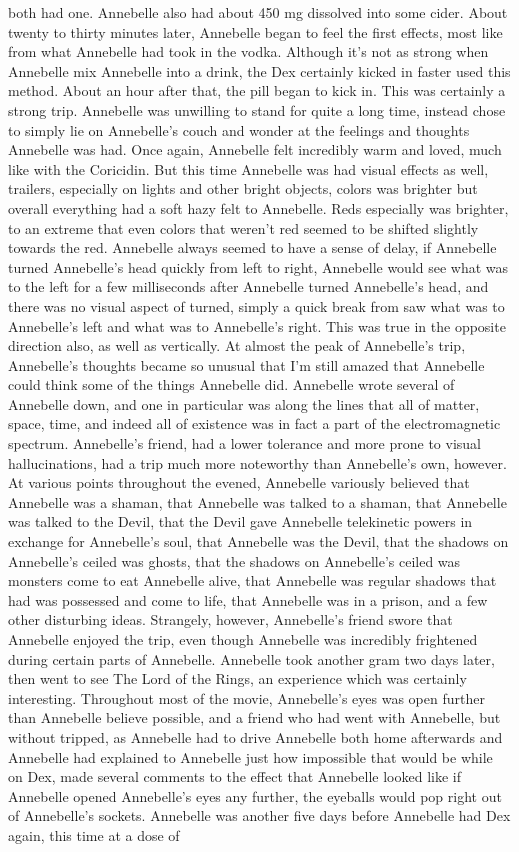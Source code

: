 \documentclass[12pt]{book}
\begin{document}
both had one. Annebelle also had about 450 mg dissolved into some cider. About twenty to thirty minutes later, Annebelle began to feel the first effects, most like from what Annebelle had took in the vodka. Although it's not as strong when Annebelle mix Annebelle into a drink, the Dex certainly kicked in faster used this method. About an hour after that, the pill began to kick in. This was certainly a strong trip. Annebelle was unwilling to stand for quite a long time, instead chose to simply lie on Annebelle's couch and wonder at the feelings and thoughts Annebelle was had. Once again, Annebelle felt incredibly warm and loved, much like with the Coricidin. But this time Annebelle was had visual effects as well, trailers, especially on lights and other bright objects, colors was brighter but overall everything had a soft hazy felt to Annebelle. Reds especially was brighter, to an extreme that even colors that weren't red seemed to be shifted slightly towards the red. Annebelle always seemed to have a sense of delay, if Annebelle turned Annebelle's head quickly from left to right, Annebelle would see what was to the left for a few milliseconds after Annebelle turned Annebelle's head, and there was no visual aspect of turned, simply a quick break from saw what was to Annebelle's left and what was to Annebelle's right. This was true in the opposite direction also, as well as vertically. At almost the peak of Annebelle's trip, Annebelle's thoughts became so unusual that I'm still amazed that Annebelle could think some of the things Annebelle did. Annebelle wrote several of Annebelle down, and one in particular was along the lines that all of matter, space, time, and indeed all of existence was in fact a part of the electromagnetic spectrum. Annebelle's friend, had a lower tolerance and more prone to visual hallucinations, had a trip much more noteworthy than Annebelle's own, however. At various points throughout the evened, Annebelle variously believed that Annebelle was a shaman, that Annebelle was talked to a shaman, that Annebelle was talked to the Devil, that the Devil gave Annebelle telekinetic powers in exchange for Annebelle's soul, that Annebelle was the Devil, that the shadows on Annebelle's ceiled was ghosts, that the shadows on Annebelle's ceiled was monsters come to eat Annebelle alive, that Annebelle was regular shadows that had was possessed and come to life, that Annebelle was in a prison, and a few other disturbing ideas. Strangely, however, Annebelle's friend swore that Annebelle enjoyed the trip, even though Annebelle was incredibly frightened during certain parts of Annebelle. Annebelle took another gram two days later, then went to see The Lord of the Rings, an experience which was certainly interesting. Throughout most of the movie, Annebelle's eyes was open further than Annebelle believe possible, and a friend who had went with Annebelle, but without tripped, as Annebelle had to drive Annebelle both home afterwards and Annebelle had explained to Annebelle just how impossible that would be while on Dex, made several comments to the effect that Annebelle looked like if Annebelle opened Annebelle's eyes any further, the eyeballs would pop right out of Annebelle's sockets. Annebelle was another five days before Annebelle had Dex again, this time at a dose of 
\end{document}
